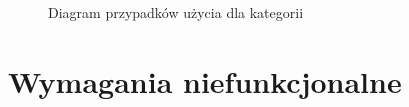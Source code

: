 \begin{figure}[t]
	\centering
	\caption{Diagram przypadków użycia dla kategorii}
	\label{fig:use-case-category}
\end{figure}

\section{Wymagania niefunkcjonalne}
\label{sec:wymagania-niefunkcjonalne}

